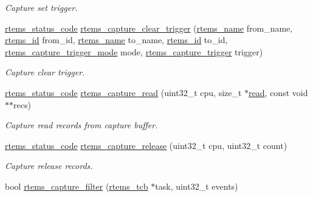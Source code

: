 \begin{DoxyCompactItemize}
\begin{DoxyCompactList}\small\item\em Capture set trigger. \end{DoxyCompactList}\item 
\mbox{\hyperlink{group__ClassicStatus_ga545d41846817eaba6143d52ee4d9e9fe}{rtems\+\_\+status\+\_\+code}} \mbox{\hyperlink{group__libmisc__capture_gabe3c08ac77848a7880d79a63f73f48f0}{rtems\+\_\+capture\+\_\+clear\+\_\+trigger}} (\mbox{\hyperlink{group__ClassicTasks_ga55fb63c49f68c0cbd9bee004da15b1fd}{rtems\+\_\+name}} from\+\_\+name, \mbox{\hyperlink{group__ClassicTasks_gab20892b814dced7dd4e5b9bf42becd57}{rtems\+\_\+id}} from\+\_\+id, \mbox{\hyperlink{group__ClassicTasks_ga55fb63c49f68c0cbd9bee004da15b1fd}{rtems\+\_\+name}} to\+\_\+name, \mbox{\hyperlink{group__ClassicTasks_gab20892b814dced7dd4e5b9bf42becd57}{rtems\+\_\+id}} to\+\_\+id, \mbox{\hyperlink{group__libmisc__capture_ga56557affa8f3021c9d5ed6ebca98f473}{rtems\+\_\+capture\+\_\+trigger\+\_\+mode}} mode, \mbox{\hyperlink{group__libmisc__capture_ga5fd896f3981ec7db204355a0e527a074}{rtems\+\_\+capture\+\_\+trigger}} trigger)
\begin{DoxyCompactList}\small\item\em Capture clear trigger. \end{DoxyCompactList}\item 
\mbox{\hyperlink{group__ClassicStatus_ga545d41846817eaba6143d52ee4d9e9fe}{rtems\+\_\+status\+\_\+code}} \mbox{\hyperlink{group__libmisc__capture_ga7b1b3c7f11c2d7fd3fbca0e1bf09f32f}{rtems\+\_\+capture\+\_\+read}} (uint32\+\_\+t cpu, size\+\_\+t $\ast$\mbox{\hyperlink{libcsupport_2src_2read_8c_a26d4711c05afec4c7771c3d17b2db9e9}{read}}, const void $\ast$$\ast$recs)
\begin{DoxyCompactList}\small\item\em Capture read records from capture buffer. \end{DoxyCompactList}\item 
\mbox{\hyperlink{group__ClassicStatus_ga545d41846817eaba6143d52ee4d9e9fe}{rtems\+\_\+status\+\_\+code}} \mbox{\hyperlink{group__libmisc__capture_ga24a1e78b28e940d3947a32a6548557e6}{rtems\+\_\+capture\+\_\+release}} (uint32\+\_\+t cpu, uint32\+\_\+t count)
\begin{DoxyCompactList}\small\item\em Capture release records. \end{DoxyCompactList}\item 
bool \mbox{\hyperlink{group__libmisc__capture_ga01d4b688031290f7f435ae4eb945be36}{rtems\+\_\+capture\+\_\+filter}} (\mbox{\hyperlink{group__ClassicTasks_gadd9f38f296a7833767355b8236f68908}{rtems\+\_\+tcb}} $\ast$task, uint32\+\_\+t events)
$$
\end{DoxyCompactItemize}

